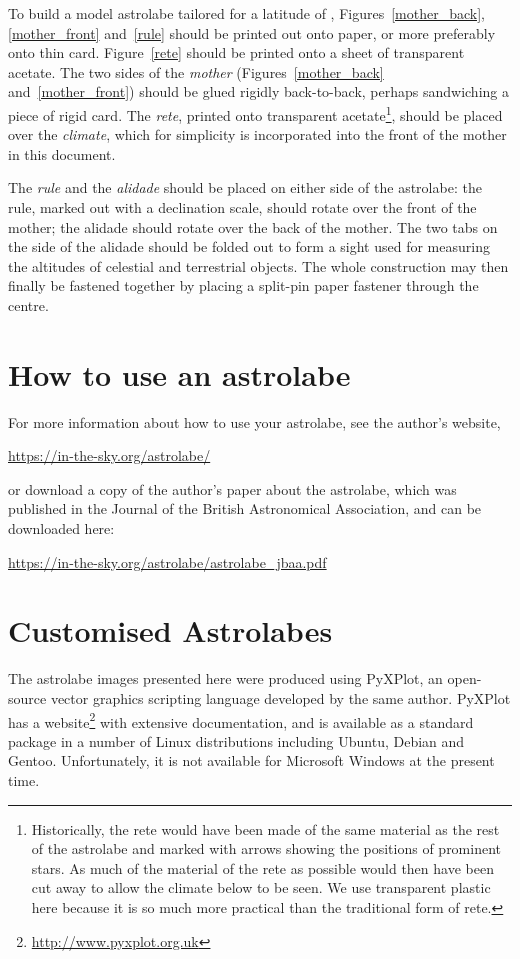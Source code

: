 \documentclass[a4paper,onecolumn,10pt]{article}
\begin{document}
To build a model astrolabe tailored for a latitude of ,
Figures~\ref{mother_back}, \ref{mother_front} and~\ref{rule} should be printed
out onto paper, or more preferably onto thin card.  Figure~\ref{rete} should be
printed onto a sheet of transparent acetate.  The two sides of the {\it mother}
(Figures~\ref{mother_back} and~\ref{mother_front}) should be glued rigidly
back-to-back, perhaps sandwiching a piece of rigid card. The {\it rete},
printed onto transparent acetate\footnote{Historically, the rete would have
been made of the same material as the rest of the astrolabe and marked with
arrows showing the positions of prominent stars. As much of the material of the
rete as possible would then have been cut away to allow the climate below to be
seen. We use transparent plastic here because it is so much more practical than
the traditional form of rete.}, should be placed over the {\it climate}, which
for simplicity is incorporated into the front of the mother in this document.

The {\it rule} and the {\it alidade} should be placed on either side of the
astrolabe: the rule, marked out with a declination scale, should rotate over
the front of the mother; the alidade should rotate over the back of the mother.
The two tabs on the side of the alidade should be folded out to form a sight
used for measuring the altitudes of celestial and terrestrial objects.  The
whole construction may then finally be fastened together by placing a split-pin
paper fastener through the centre.

\section*{How to use an astrolabe}

For more information about how to use your astrolabe, see the author's website,

\centerline{\url{https://in-the-sky.org/astrolabe/}}

or download a copy of the author's paper about the astrolabe, which was published in the Journal of the British Astronomical Association, and can be downloaded here:

\centerline{\url{https://in-the-sky.org/astrolabe/astrolabe\_jbaa.pdf}}

\section*{Customised Astrolabes}

The astrolabe images presented here were produced using PyXPlot, an open-source
vector graphics scripting language developed by the same author.  PyXPlot has a
website\footnote{\url{http://www.pyxplot.org.uk}} with extensive documentation,
and is available as a standard package in a number of Linux distributions
including Ubuntu, Debian and Gentoo. Unfortunately, it is not available for
Microsoft Windows at the present time.
\end{document}
